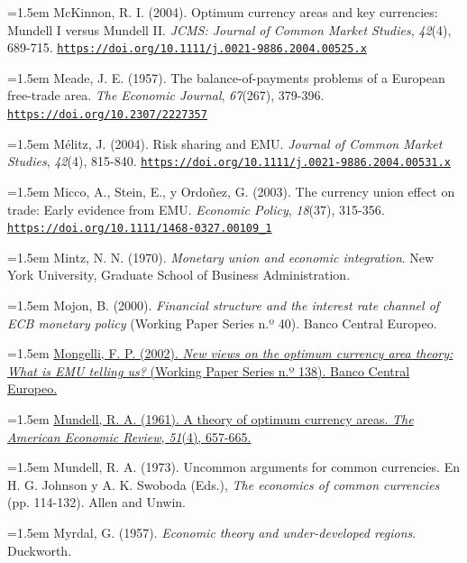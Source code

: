 \documentclass[10pt,a4paper]{article}
\begin{document}
\noindent\hangindent=1.5em McKinnon, R. I. (2004). Optimum currency areas and key currencies: Mundell I versus Mundell II. \textit{JCMS: Journal of Common Market Studies}, \textit{42}(4), 689-715. \href{https://doi.org/10.1111/j.0021-9886.2004.00525.x}{\nolinkurl{https://doi.org/10.1111/j.0021-9886.2004.00525.x}}

\noindent\hangindent=1.5em Meade, J. E. (1957). The balance-of-payments problems of a European free-trade area. \textit{The Economic Journal}, \textit{67}(267), 379-396. \href{https://doi.org/10.2307/2227357}{\nolinkurl{https://doi.org/10.2307/2227357}}

\noindent\hangindent=1.5em Mélitz, J. (2004). Risk sharing and EMU. \textit{Journal of Common Market Studies}, \textit{42}(4), 815-840. \href{https://doi.org/10.1111/j.0021-9886.2004.00531.x}{\nolinkurl{https://doi.org/10.1111/j.0021-9886.2004.00531.x}}

\noindent\hangindent=1.5em Micco, A., Stein, E., y Ordoñez, G. (2003). The currency union effect on trade: Early evidence from EMU. \textit{Economic Policy}, \textit{18}(37), 315-356. \href{https://doi.org/10.1111/1468-0327.00109_1}{\nolinkurl{https://doi.org/10.1111/1468-0327.00109_1}}

\noindent\hangindent=1.5em Mintz, N. N. (1970). \textit{Monetary union and economic integration}. New York University, Graduate School of Business Administration.

\noindent\hangindent=1.5em Mojon, B. (2000). \textit{Financial structure and the interest rate channel of ECB monetary policy} (Working Paper Series n.º 40). Banco Central Europeo.

\noindent\hangindent=1.5em \href{https://www.ecb.europa.eu/pub/pdf/scpwps/ecbwp138.pdf}{Mongelli, F. P. (2002). \textit{New views on the optimum currency area theory: What is EMU telling us?} (Working Paper Series n.º 138). Banco Central Europeo.}

\noindent\hangindent=1.5em \href{https://www.jstor.org/stable/1812792}{Mundell, R. A. (1961). A theory of optimum currency areas. \textit{The American Economic Review}, \textit{51}(4), 657-665.}

\noindent\hangindent=1.5em Mundell, R. A. (1973). Uncommon arguments for common currencies. En H. G. Johnson y A. K. Swoboda (Eds.), \textit{The economics of common currencies} (pp. 114-132). Allen and Unwin.

\noindent\hangindent=1.5em Myrdal, G. (1957). \textit{Economic theory and under-developed regions}. Duckworth.
\end{document}

